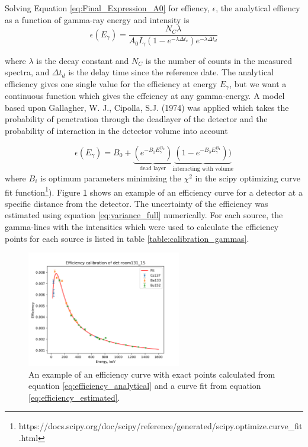 \noindent Solving Equation \ref{eq:Final_Expression_A0} for effiency, $\epsilon$, the analytical effiency as a function of gamma-ray energy and intensity is 
\begin{equation} \label{eq:efficiency_analytical}
    \epsilon(E_\gamma)= \frac{N_C \lambda}{A_0 I_\gamma (1-e^{-\lambda \Delta t_c})e^{-\lambda\Delta t_d}}
\end{equation}

where $\lambda$ is the decay constant and $N_C$ is the number of counts in the measured spectra, and $\Delta t_d$ is the delay time since the reference date. The analytical efficiency gives one single value for the efficiency at energy $E_\gamma$, but we want a continuous function which gives the effciency at any gamma-energy. A model based upon Gallagher, W. J., Cipolla, S.J. (1974) was applied which takes the probability of penetration through the deadlayer of the detector and the probability of interaction in the detector volume into account

\begin{equation} \label{eq:efficiency_estimated}
\epsilon(E_\gamma) =  B_0 + \underbrace{(e^{-B_1 E_\gamma^{B_2}})}_\text{dead layer}  \underbrace{(1-e^{-B_3 E_\gamma^{B_4}}))}_\text{interacting with volume} 
\end{equation}
\noindent 
where $B_i$ is optimum parameters minimizing the $\chi^2$ in the scipy optimizing curve fit function\footnote{https://docs.scipy.org/doc/scipy/reference/generated/scipy.optimize.curve_fit.html}). Figure \ref{fig:efficiency_curve} shows an example of an efficiency curve for a detector at a specific distance from the detector. The uncertainty of the efficiency was estimated using equation \ref{eq:variance_full} numerically. For each source, the gamma-lines with the intensities which were used to calculate the efficiency points for each source is listed in table \ref{table:calibration_gammas}. \\


\begin{figure}
    \centering
    \includegraphics[width=0.6\textwidth]{Experiment/room131_15.png}
    \caption{An example of an efficiency curve with exact points calculated from equation \ref{eq:efficiency_analytical} and a curve fit from equation \ref{eq:efficiency_estimated}. }
    \label{fig:efficiency_curve}
\end{figure}

